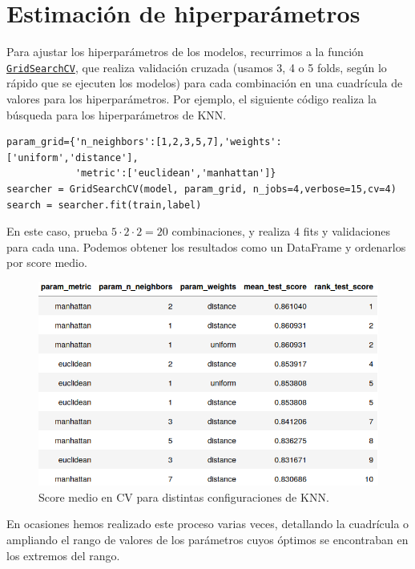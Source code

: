 \documentclass{article}
\begin{document}
\pagebreak

\section{Estimación de hiperparámetros}

Para ajustar los hiperparámetros de los modelos, recurrimos a la
función
\href{https://scikit-learn.org/stable/modules/generated/sklearn.model_selection.GridSearchCV.html}{\texttt{GridSearchCV}},
que realiza validación cruzada (usamos 3, 4 o 5 folds, según lo rápido
que se ejecuten los modelos) para cada combinación en una cuadrícula
de valores para los hiperparámetros. Por ejemplo, el siguiente código
realiza la búsqueda para los hiperparámetros de KNN.
\begin{lstlisting}
param_grid={'n_neighbors':[1,2,3,5,7],'weights':['uniform','distance'],
            'metric':['euclidean','manhattan']}
searcher = GridSearchCV(model, param_grid, n_jobs=4,verbose=15,cv=4)
search = searcher.fit(train,label)
\end{lstlisting}
En este caso, prueba $5\cdot 2\cdot 2=20$ combinaciones, y realiza 4
fits y validaciones para cada una. Podemos obtener los resultados como
un DataFrame y ordenarlos por score medio.

\begin{figure}[H]
  \centering
  \includegraphics[width=140mm]{imgs/tune-knn}
  \caption{Score medio en CV para distintas configuraciones de KNN.}
  \label{fig:tune-knn}
\end{figure}

En ocasiones hemos realizado este proceso varias veces, detallando la
cuadrícula o ampliando el rango de valores de los parámetros cuyos
óptimos se encontraban en los extremos del rango.
\end{document}
